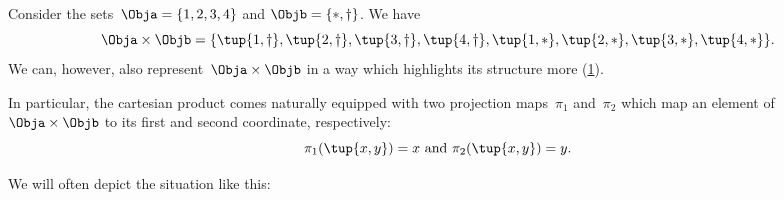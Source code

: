 \begin{example}
Consider the sets~$\Obja = \{1, 2, 3, 4\}$ and $\Objb = \{ \ast, \dagger \}$.
We have
\begin{equation*}
\Obja \times \Objb = \{ \tup{1, \dagger}, \tup{2, \dagger}, \tup{3, \dagger}, \tup{4, \dagger}, \tup{1, *}, \tup{2, *}, \tup{3, *}, \tup{4, *} \}.
\end{equation*}
We can, however, also represent~$\Obja \times \Objb$ in a way which highlights its structure more (\cref{fig:example_cartesian}).

\begin{figure}[h!]
\begin{center}
\end{center}
\caption{\label{fig:example_cartesian}}
\end{figure}
In particular, the cartesian product comes naturally equipped with two projection maps~$\pi_1$ and~$\pi_2$ which map an element of~$\Obja \times \Objb$ to its first and second coordinate, respectively:
\begin{equation*}
\pi_1(\tup{x,y}) =  x \text{ and } \pi_2(\tup{x,y}) = y.
\end{equation*}

We will often depict the situation like this:
\begin{center}
\end{center}
\end{example}



%


